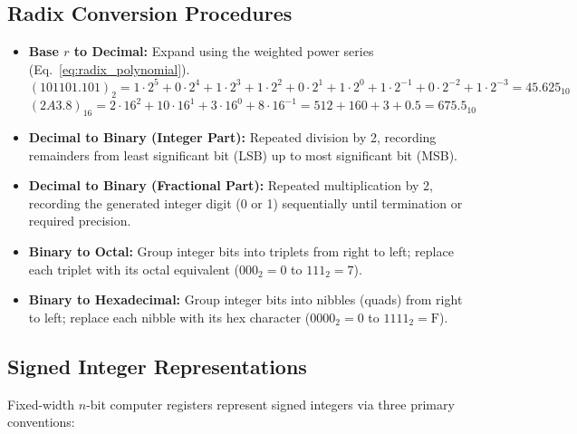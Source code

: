 \subsection{Radix Conversion Procedures}
\begin{itemize}
    \item \textbf{Base $r$ to Decimal:} Expand using the weighted power series (Eq.~\ref{eq:radix_polynomial}).
    \[ (101101.101)_2 = 1\cdot 2^5 + 0\cdot 2^4 + 1\cdot 2^3 + 1\cdot 2^2 + 0\cdot 2^1 + 1\cdot 2^0 + 1\cdot 2^{-1} + 0\cdot 2^{-2} + 1\cdot 2^{-3} = 45.625_{10} \]
    \[ (2A3.8)_{16} = 2\cdot 16^2 + 10\cdot 16^1 + 3\cdot 16^0 + 8\cdot 16^{-1} = 512 + 160 + 3 + 0.5 = 675.5_{10} \]
    \item \textbf{Decimal to Binary (Integer Part):} Repeated division by 2, recording remainders from least significant bit (LSB) up to most significant bit (MSB).
    \item \textbf{Decimal to Binary (Fractional Part):} Repeated multiplication by 2, recording the generated integer digit (0 or 1) sequentially until termination or required precision.
    \item \textbf{Binary to Octal:} Group integer bits into triplets from right to left; replace each triplet with its octal equivalent ($000_2=0$ to $111_2=7$).
    \item \textbf{Binary to Hexadecimal:} Group integer bits into nibbles (quads) from right to left; replace each nibble with its hex character ($0000_2=0$ to $1111_2=\text{F}$).
\end{itemize}

\subsection{Signed Integer Representations}
Fixed-width $n$-bit computer registers represent signed integers via three primary conventions:

